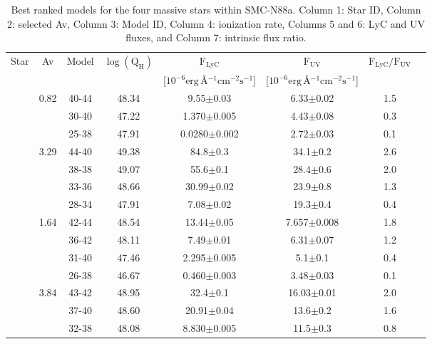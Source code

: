\documentclass[baaa]{baaa}
\begin{document}
\begin{table*}[!t]
\centering
\caption{ Best ranked models for the four massive stars within SMC-N88a.
Column 1: Star ID, Column 2:  selected Av, Column 3: Model ID, Column 4: ionization rate, Columns 5 and 6: LyC and UV fluxes, and Column 7: intrinsic flux ratio. }
    \begin{tabular}{lccccccc}
    \hline\hline\noalign{\smallskip}
    Star & Av &Model& $\log(\mathrm{Q_H})$& $\mathrm{F_{LyC}}$ &$\mathrm{F_{UV}}$& $\mathrm{F_{LyC}/F_{UV}}$\\
    &  \!\![mag]& \!\!\! & \!\! [ph \,$\mathrm{s}^{-1}$]&[$10^{-6}\mathrm{erg}$\,\AA$^{-1}\mathrm{cm}^{-2}\mathrm{s}^{-1}$]&[$10^{-6}\mathrm{erg}$\,\AA$^{-1}\mathrm{cm}^{-2}\mathrm{s}^{-1}$]& \\
    \hline\noalign{\smallskip}
    \!\!37 & 0.82  & 40-44      & 48.34&    9.55$\pm$0.03   &6.33$\pm$0.02&1.5\\
                   &&30-40      & 47.22&    1.370$\pm$0.005  &4.43$\pm$0.08&0.3\\
                   &&25-38      & 47.91&   0.0280$\pm$0.002  &2.72$\pm$0.03&0.1\\
    \hline
    \!\!41 & 3.29   & 44-40     & 49.38&    84.8$\pm$0.3  &34.1$\pm$0.2&2.6\\
                    &&38-38     & 49.07&    55.6$\pm$0.1  &28.4$\pm$0.6& 2.0\\
                    &&33-36     & 48.66&   30.99$\pm$0.02 &23.9$\pm$0.8&1.3\\
                    &&28-34     & 47.91&    7.08$\pm$0.02 &19.3$\pm$0.4&0.4\\
                    
    \!\!42 & 1.64   & 42-44     & 48.54&    13.44$\pm$0.05 &7.657$\pm$0.008&1.8\\
                    &&36-42     & 48.11&     7.49$\pm$0.01 &6.31$\pm$0.07&1.2\\
                    &&31-40     & 47.46&    2.295$\pm$0.005&5.1$\pm$0.1&0.4\\
                    &&26-38     & 46.67&    0.460$\pm$0.003&3.48$\pm$0.03&0.1\\
    \hline
    \!\!47 & 3.84   & 43-42     & 48.95&    32.4$\pm$0.1    &16.03$\pm$0.01&2.0\\
                    &&37-40     & 48.60&   20.91$\pm$0.04   &13.6$\pm$0.2&1.6\\
                    &&32-38     & 48.08&    8.830$\pm$0.005  &11.5$\pm$0.3&0.8\\
                    
    \hline
    \end{tabular}
\label{tabla1}
\end{table*}
\end{document}
